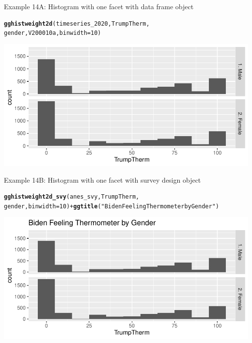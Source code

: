 \documentclass{beamer}\usepackage[]{graphicx}\usepackage[]{color}
\makeatletter
\newcommand{\hlnum}[1]{\textcolor[rgb]{0.686,0.059,0.569}{#1}}%
\newcommand{\hlstr}[1]{\textcolor[rgb]{0.192,0.494,0.8}{#1}}%
\newcommand{\hlopt}[1]{\textcolor[rgb]{0,0,0}{#1}}%
\newcommand{\hlstd}[1]{\textcolor[rgb]{0.345,0.345,0.345}{#1}}%
\newcommand{\hlkwc}[1]{\textcolor[rgb]{0.333,0.667,0.333}{#1}}%
\newcommand{\hlkwd}[1]{\textcolor[rgb]{0.737,0.353,0.396}{\textbf{#1}}}%
\newenvironment{kframe}{%
 \def\at@end@of@kframe{}%
 \ifinner\ifhmode%
  \def\at@end@of@kframe{\end{minipage}}%
  \begin{minipage}{\columnwidth}%
 \fi\fi%
 \def\FrameCommand##1{\hskip\@totalleftmargin \hskip-\fboxsep
 \colorbox{shadecolor}{##1}\hskip-\fboxsep
     \hskip-\linewidth \hskip-\@totalleftmargin \hskip\columnwidth}%
 \MakeFramed {\advance\hsize-\width
   \@totalleftmargin\z@ \linewidth\hsize
   \@setminipage}}%
 {\par\unskip\endMakeFramed%
 \at@end@of@kframe}
\newenvironment{knitrout}{}{} %
\makeatother
\begin{document}
\begin{frame}[fragile]{Example 14A: Histogram with one facet with data frame object}
\begin{knitrout}
\color{fgcolor}\begin{kframe}
\begin{alltt}
\hlkwd{gghistweight2d}\hlstd{(timeseries_2020, TrumpTherm,}
    \hlstd{gender, V200010a,} \hlkwc{binwidth} \hlstd{=} \hlnum{10}\hlstd{)}
\end{alltt}
\end{kframe}
\includegraphics[width=0.95\linewidth]{figure/unnamed-chunk-56-1} 
\end{knitrout}
\end{frame}

\begin{frame}[fragile]{Example 14B: Histogram with one facet with survey design object}
\begin{knitrout}
\color{fgcolor}\begin{kframe}
\begin{alltt}
\hlkwd{gghistweight2d_svy}\hlstd{(anes_svy, TrumpTherm,}
    \hlstd{gender,} \hlkwc{binwidth} \hlstd{=} \hlnum{10}\hlstd{)} \hlopt{+} \hlkwd{ggtitle}\hlstd{(}\hlstr{"Biden Feeling Thermometer by Gender"}\hlstd{)}
\end{alltt}
\end{kframe}
\includegraphics[width=0.95\linewidth]{figure/unnamed-chunk-57-1} 
\end{knitrout}

\end{frame}
\end{document}
